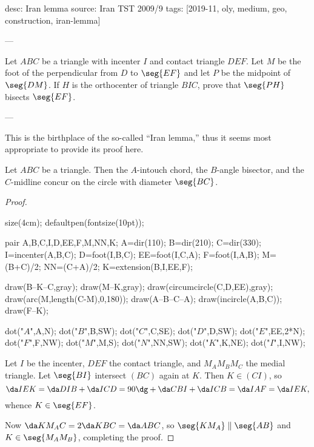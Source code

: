 desc: Iran lemma
source: Iran TST 2009/9
tags: [2019-11, oly, medium, geo, construction, iran-lemma]

---

Let $ABC$ be a triangle with incenter $I$ and contact triangle $DEF$. Let $M$ be the foot of the perpendicular from $D$ to $\seg{EF}$ and let $P$ be the midpoint of $\seg{DM}$. If $H$ is the orthocenter of triangle $BIC$, prove that $\seg{PH}$ bisects $\seg{EF}$.

---

This is the birthplace of the so-called ``Iran lemma,'' thus it seems most appropriate to provide its proof here.
\begin{lemma*}
    Let $ABC$ be a triangle. Then the $A$-intouch chord, the $B$-angle bisector, and the $C$-midline concur on the circle with diameter $\seg{BC}$.
\end{lemma*}
\begin{proof}\ 
    \begin{center}
        \begin{asy}
            size(4cm); defaultpen(fontsize(10pt));

            pair A,B,C,I,D,EE,F,M,NN,K;
            A=dir(110);
            B=dir(210);
            C=dir(330);
            I=incenter(A,B,C);
            D=foot(I,B,C);
            EE=foot(I,C,A);
            F=foot(I,A,B);
            M=(B+C)/2;
            NN=(C+A)/2;
            K=extension(B,I,EE,F);

            draw(B--K--C,gray);
            draw(M--K,gray);
            draw(circumcircle(C,D,EE),gray);
            draw(arc(M,length(C-M),0,180));
            draw(A--B--C--A);
            draw(incircle(A,B,C));
            draw(F--K);

            dot("$A$",A,N);
            dot("$B$",B,SW);
            dot("$C$",C,SE);
            dot("$D$",D,SW);
            dot("$E$",EE,2*N);
            dot("$F$",F,NW);
            dot("$M$",M,S);
            dot("$N$",NN,SW);
            dot("$K$",K,NE);
            dot("$I$",I,NW);
        \end{asy}
    \end{center}
    Let $I$ be the incenter, $DEF$ the contact triangle, and $M_AM_BM_C$ the medial triangle. Let $\seg{BI}$ intersect $(BC)$ again at $K$. Then $K\in(CI)$, so \[\da IEK=\da DIB+\da ICD=90\dg+\da CBI+\da ICB=\da IAF=\da IEK,\]
    whence $K\in\seg{EF}$.

    Now $\da KM_AC=2\da KBC=\da ABC$, so $\seg{KM_A}\parallel\seg{AB}$ and $K\in\seg{M_AM_B}$, completing the proof.
\end{proof}
